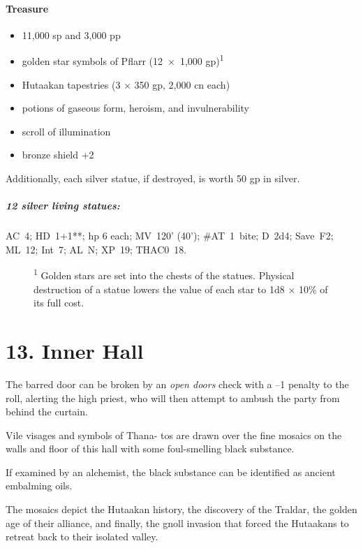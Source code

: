 \documentclass[english,11pt,openany,letterpaper,twocolumn]{book}
\begin{document}
\skipline
\paragraph{Treasure}
\begin{itemize}[leftmargin=*]
	\item 11,000 sp and 3,000 pp
	\item golden star symbols of Pflarr (12~×~1,000 gp)\textsuperscript{1}
	\item Hutaakan tapestries (3 × 350 gp, 2,000 cn each)
	\item potions of gaseous form, heroism, and invulnerability
	\item scroll of illumination
	\item bronze shield +2
\end{itemize}

Additionally, each silver statue, if destroyed, is worth 50 gp in silver.

\begin{textbox}
	\subparagraph{12 silver living statues:} AC~4; HD~1+1**; hp 6 each; MV~120' (40'); \#AT~1~bite; D~2d4; Save~F2; ML~12; Int~7; AL~N; XP~19; THAC0~18.
\end{textbox}

\begin{figure}[b]
\color{darkgray}
\uln[8]

\textsuperscript{1} Golden stars are set into the chests of the statues. Physical destruction of a statue lowers the value of each star to 1d8 × 10\% of its full cost.
\end{figure}


\hypertarget{room13}{}
\section{13. Inner Hall}

The barred door can be broken by an \emph{open doors} check with a --1 penalty to the roll, alerting the high priest, who will then attempt to ambush the party from behind the curtain.


\tab Vile visages and symbols of Thana- tos are drawn over the fine mosaics on the walls and floor of this hall with some foul-smelling black substance.

\tab If examined by an alchemist, the black substance can be identified as ancient embalming oils.

\tab The mosaics depict the Hutaakan history, the discovery of the Traldar, the golden age of their alliance, and finally, the gnoll invasion that forced the Hutaakans to retreat back to their isolated valley.
\end{document}
